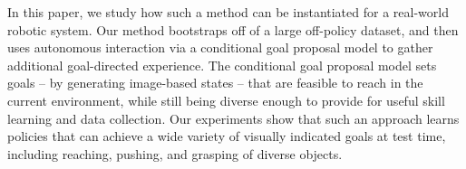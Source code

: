 In this paper, we study how such a method can be instantiated for a real-world robotic system. Our method bootstraps off of a large off-policy dataset, and then uses autonomous interaction via a conditional goal proposal model to gather additional goal-directed experience. The conditional goal proposal model sets goals -- by generating image-based states -- that are feasible to reach in the current environment, while still being diverse enough to provide for useful skill learning and data collection. Our experiments show that such an approach learns policies that can achieve a wide variety of visually indicated goals at test time, including reaching, pushing, and grasping of diverse objects.


